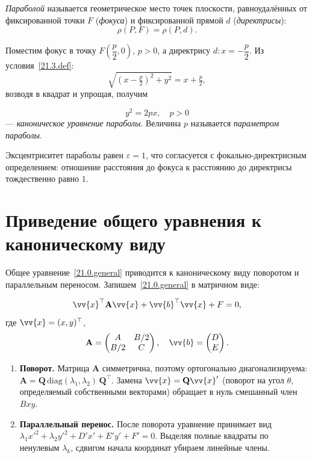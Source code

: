 \begin{defn}
\textit{Параболой} называется геометрическое место точек плоскости, равноудалённых от фиксированной точки $F$ (\textit{фокуса}) и фиксированной прямой $d$ (\textit{директрисы}):
\begin{equation}\label{21.3.def}
  \rho(P, F) = \rho(P, d).
\end{equation}
\end{defn}

Поместим фокус в точку $F\!\left(\dfrac{p}{2}, 0\right)$, $p > 0$, а директрису $d\colon x = -\dfrac{p}{2}$. Из условия~\eqref{21.3.def}:
\[
\sqrt{\!\left(x-\tfrac{p}{2}\right)^{\!2}+y^2} = x + \tfrac{p}{2},
\]
возводя в квадрат и упрощая, получим

\begin{equation}\label{21.3.canon}
  y^2 = 2px, \quad p > 0
\end{equation}
--- \textit{каноническое уравнение параболы}. Величина $p$ называется \textit{параметром параболы}.

\begin{notion}
Эксцентриситет параболы равен $\varepsilon = 1$, что согласуется с фокально-директрисным определением: отношение расстояния до фокуса к расстоянию до директрисы тождественно равно $1$.
\end{notion}

\section{Приведение общего уравнения к каноническому виду}

Общее уравнение~\eqref{21.0.general} приводится к каноническому виду поворотом и параллельным переносом. Запишем~\eqref{21.0.general} в матричном виде:

\begin{equation}\label{21.4.matrix}
  \vv{x}^{\top} \mathbf{A} \vv{x} + \vv{b}^{\top}\vv{x} + F = 0,
\end{equation}
где $\vv{x} = (x,y)^{\top}$,
\[
\mathbf{A} = \begin{pmatrix} A & B/2 \\ B/2 & C \end{pmatrix}, \quad \vv{b} = \begin{pmatrix} D \\ E \end{pmatrix}.
\]

\begin{enumerate}
  \item \textbf{Поворот.} Матрица $\mathbf{A}$ симметрична, поэтому ортогонально диагонализируема: $\mathbf{A} = \mathbf{Q}\,\mathrm{diag}(\lambda_1,\lambda_2)\,\mathbf{Q}^{\top}$. Замена $\vv{x} = \mathbf{Q}\vv{x}'$ (поворот на угол $\theta$, определяемый собственными векторами) обращает в нуль смешанный член $Bxy$.
  \item \textbf{Параллельный перенос.} После поворота уравнение принимает вид $\lambda_1 x'^2 + \lambda_2 y'^2 + D'x' + E'y' + F' = 0$. Выделяя полные квадраты по ненулевым $\lambda_k$, сдвигом начала координат убираем линейные члены.
\end{enumerate}

